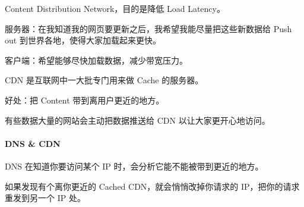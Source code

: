 \documentclass[
]{article}
\begin{document}
Content Distribution Network，目的是降低 Load Latency。

服务器：在我知道我的网页要更新之后，我希望我能尽量把这些新数据给 Push
out 到世界各地，使得大家加载起来更快。

客户端：希望能够尽快加载数据，减少带宽压力。

CDN 是互联网中一大批专门用来做 Cache 的服务器。

好处：把 Content 带到离用户更近的地方。

有些数据大量的网站会主动把数据推送给 CDN 以让大家更开心地访问。

\hypertarget{header-n224}{%
\paragraph{DNS \& CDN}\label{header-n224}}

DNS 在知道你要访问某个 IP 时，会分析它能不能被带到更近的地方。

如果发现有个离你更近的 Cached CDN，就会悄悄改掉你请求的
IP，把你的请求重发到另一个 IP 处。
\end{document}
